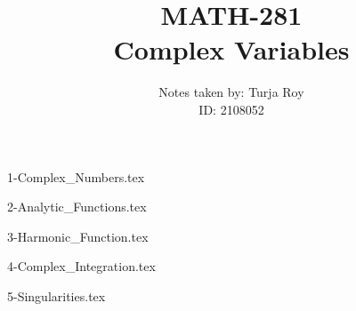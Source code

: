 \documentclass[12pt]{article}
\title{
    \textbf{MATH-281} \\
    \textbf{Complex Variables}
}
\author{
    Notes taken by: Turja Roy \\
    ID: 2108052
}
\date{}
\numberwithin{equation}{subsection}
\begin{document}
\maketitle

\tableofcontents

\newpage
{1-Complex_Numbers.tex}

\newpage
{2-Analytic_Functions.tex}

\newpage
{3-Harmonic_Function.tex}

\newpage
{4-Complex_Integration.tex}

\newpage
{5-Singularities.tex}
\end{document}
